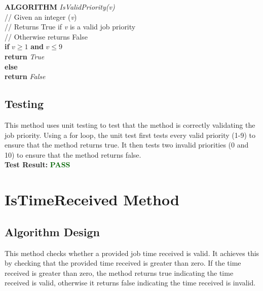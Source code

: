\documentclass[12pt,a4paper]{article}
\begin{document}
			\textbf{ALGORITHM} \textit{IsValidPriority(v)}\\
			\null\hspace{1cm}// Given an integer (\textit{v})\\
			\null\hspace{1cm}// Returns True if \textit{v} is a valid job priority\\
			\null\hspace{1cm}// Otherwise returns False\\
			\null\hspace{1cm}\textbf{if} \textit{$v \geq 1$} \textbf{and} \textit{$v \leq 9$}\\
			\null\hspace{2cm}\textbf{return} \textit{True}\\
			\null\hspace{1cm}\textbf{else}\\
			\null\hspace{2cm}\textbf{return} \textit{False}\\
			
		\subsection{Testing}
			This method uses unit testing to test that the method is correctly validating the 
			job priority. Using a for loop, the unit test first tests every valid priority (1-9) to ensure that 
			the method returns true. It then tests two invalid priorities (0 and 10) to ensure that the method 
			returns false.\\

			\textbf{Test Result:} \textbf{\textcolor{darkgreen}{PASS}}\\

	\newpage

	\section{IsTimeReceived Method}
		\subsection{Algorithm Design}
			This method checks whether a provided job time received is valid. It achieves this by
			checking that the provided time received is greater than zero. If the time received is
			greater than zero, the method returns true indicating the time received is valid, otherwise
			it returns false indicating the time received is invalid.\\
\end{document}
